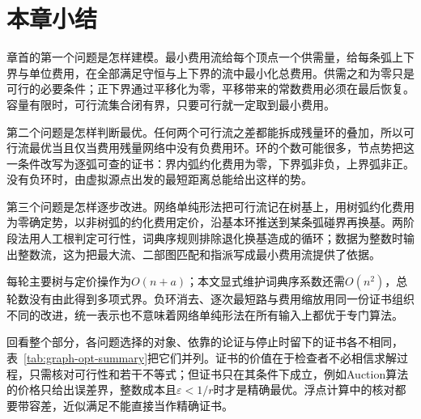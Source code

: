 \FloatBarrier
\section{本章小结}
\label{sec:min-cost-flow-summary}

章首的第一个问题是怎样建模。最小费用流给每个顶点一个供需量，给每条弧上下界与单位费用，在全部满足守恒与上下界的流中最小化总费用。供需之和为零只是可行的必要条件；正下界通过平移化为零，平移带来的常数费用必须在最后恢复。容量有限时，可行流集合闭有界，只要可行就一定取到最小费用。

第二个问题是怎样判断最优。任何两个可行流之差都能拆成残量环的叠加，所以可行流最优当且仅当费用残量网络中没有负费用环。环的个数可能很多，节点势把这一条件改写为逐弧可查的证书：界内弧约化费用为零，下界弧非负，上界弧非正。没有负环时，由虚拟源点出发的最短距离总能给出这样的势。

第三个问题是怎样逐步改进。网络单纯形法把可行流记在树基上，用树弧约化费用为零确定势，以非树弧的约化费用定价，沿基本环推送到某条弧碰界再换基。两阶段法用人工根判定可行性，词典序规则排除退化换基造成的循环；数据为整数时输出整数流，这为把最大流、二部图匹配和指派写成最小费用流提供了依据。

每轮主要树与定价操作为$O(n+a)$；本文显式维护词典序系数还需$O(n^2)$，总轮数没有由此得到多项式界。负环消去、逐次最短路与费用缩放用同一份证书组织不同的改进，统一表示也不意味着网络单纯形法在所有输入上都优于专门算法。

回看整个部分，各问题选择的对象、依靠的论证与停止时留下的证书各不相同，表~\ref{tab:graph-opt-summary}把它们并列。证书的价值在于检查者不必相信求解过程，只需核对可行性和若干不等式；但证书只在其条件下成立，例如Auction算法的价格只给出误差界，整数成本且$\varepsilon<1/r$时才是精确最优。浮点计算中的核对都要带容差，近似满足不能直接当作精确证书。


